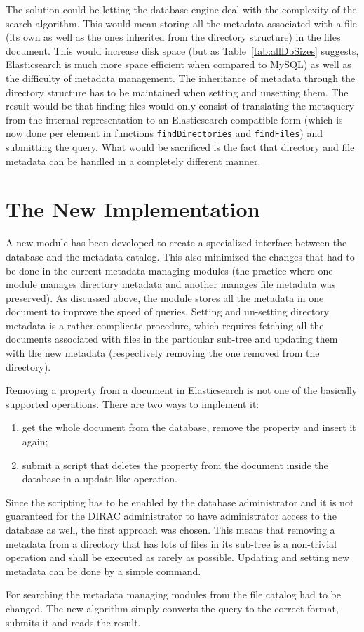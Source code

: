 The solution could be letting the database engine deal 
with the complexity of the search algorithm. This would mean storing all the metadata associated with a file (its
own as well as the ones inherited from the directory structure) in the files document. This would increase
disk space (but as Table~\ref{tab:allDbSizes} suggests, Elasticsearch is much more space efficient when compared 
to MySQL) as well as the difficulty of metadata management. The inheritance of metadata through the directory 
structure has to be maintained when setting and unsetting them. The result would be that finding files would 
only consist of translating the metaquery from the internal representation to an Elasticsearch compatible form 
(which is now done per element in functions \texttt{findDirectories} and \texttt{findFiles}) and submitting the
query. What would be sacrificed is the fact that directory and file metadata can be handled in a completely 
different manner.

\section{The New Implementation}

A new module has been developed to create a specialized interface between the database and the metadata catalog. This 
also minimized the changes that had to be done in the current metadata managing modules (the practice where one
module manages directory metadata and another manages file metadata was preserved). As discussed above, the 
module stores all the metadata in one document to improve the speed of queries. Setting and un-setting directory 
metadata is a rather complicate procedure, which requires fetching all the documents associated with files in
the particular sub-tree and updating them with the new metadata (respectively removing the one removed from the 
directory). 

Removing a property from a document in Elasticsearch is not one of the basically supported operations. There are 
two ways to implement it: 
\begin{enumerate}
\item get the whole document from the database, remove the property and insert it again;
\item submit a script that deletes the property from the document inside the database in a update-like operation.
\end{enumerate}

\noindent Since the scripting has to be enabled by the database administrator and it is not guaranteed for the DIRAC 
administrator to have administrator access to the database as well, the first approach was chosen. This means that
removing a metadata from a directory that has lots of files in its sub-tree is a non-trivial operation and shall
be executed as rarely as possible. Updating and setting new metadata can be done by a simple command.

For searching the metadata managing modules from the file catalog had to be changed. The new algorithm simply 
converts the query to the correct format, submits it and reads the result.